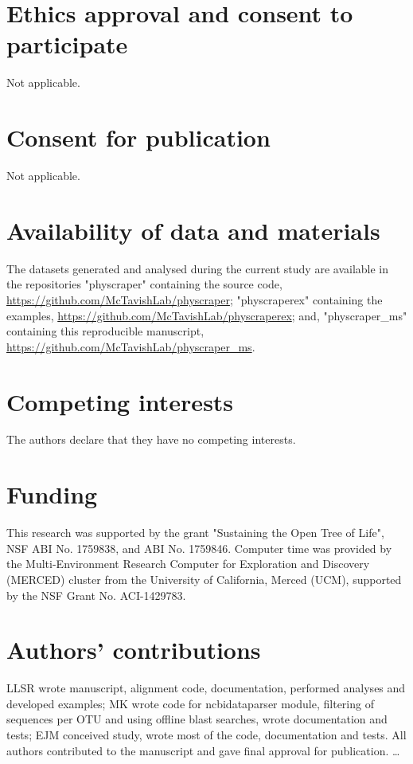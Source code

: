 \documentclass{bmcart}
\begin{document}
\begin{backmatter}

\section*{Ethics approval and consent to participate}
Not applicable.

\section*{Consent for publication}
Not applicable.

\section*{Availability of data and materials}

The datasets generated and analysed during the current study are available in
the repositories "physcraper" containing the source code,
\href{https://github.com/McTavishLab/physcraper}{https://github.com/McTavishLab/physcraper};
"physcraperex" containing the examples,
\href{https://github.com/McTavishLab/physcraperex}{https://github.com/McTavishLab/physcraperex};
and, "physcraper\_ms" containing this reproducible manuscript,
\href{https://github.com/McTavishLab/physcraper\_ms}{https://github.com/McTavishLab/physcraper\_ms}.

\section*{Competing interests}
The authors declare that they have no competing interests.

\section*{Funding}
This research was supported by the grant "Sustaining the Open Tree of Life", NSF ABI
No. 1759838, and ABI No. 1759846.
Computer time was provided by the Multi-Environment Research Computer for
Exploration and Discovery (MERCED) cluster from the University of California,
Merced (UCM), supported by the NSF Grant No. ACI-1429783.

\section*{Authors' contributions}
LLSR wrote manuscript, alignment code, documentation, performed analyses and developed examples; MK wrote code for ncbidataparser module, filtering of sequences per OTU and using offline blast searches, wrote documentation and tests; EJM conceived study, wrote most of the code, documentation and tests.
All authors contributed to the manuscript and gave final approval for publication.
\ldots


\end{backmatter}
\end{document}
